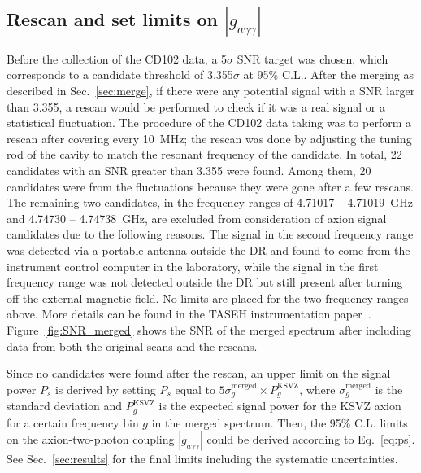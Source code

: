 \documentclass[%
reprint, %
superscriptaddress,
 amsmath,amssymb,
 aps
]{revtex4-2}
\begin{document}
\subsection{Rescan and set limits on $\left|g_{a\gamma\gamma}\right|$} 
Before the collection of the CD102 data, a 5$\sigma$ SNR target was chosen, 
which corresponds to a candidate threshold of 3.355$\sigma$ at 95\% C.L..
 After the merging as described in Sec.~\ref{sec:merge}, if there were 
any potential signal with a SNR larger than 
3.355, a rescan would be performed to check if it was a real signal 
or a statistical fluctuation. 
The procedure of the CD102 data taking was to perform a rescan after 
covering every 10~MHz; the rescan was done by adjusting the tuning rod of the 
cavity to match the resonant frequency of the candidate. 
In total, 22 candidates with an SNR greater than 3.355 were found. 
Among them, 20 candidates were from the fluctuations because they were gone 
after a few rescans. The remaining two candidates, 
in the frequency ranges of 4.71017 -- 4.71019~GHz and 4.74730 -- 4.74738~GHz, 
are excluded from consideration of axion signal candidates due to the 
following reasons. 
The signal in the second frequency range 
was detected via a portable antenna outside the DR and found 
to come from the instrument control computer in the laboratory, while the 
signal in the first frequency range 
was not detected outside the DR but 
still present after turning off the external magnetic field. 
No limits are placed for the two frequency ranges above.  
More details can be found in the 
TASEH instrumentation paper~\cite{TASEHInstrumentation}. 
Figure~\ref{fig:SNR_merged} shows the SNR of the merged spectrum after 
including data from both the original scans and the rescans. 

Since no candidates were found after the rescan, an upper limit on 
the signal power $P_s$ is derived by setting $P_s$ equal to 
$5\sigma_{g}^\text{merged}\times P_{g}^\text{KSVZ}$, where 
$\sigma_{g}^\text{merged}$ is the standard deviation 
and $P_{g}^\text{KSVZ}$ is the expected signal power for the KSVZ axion 
for a certain frequency bin $g$ in the merged spectrum. 
Then, the 95\% C.L. limits on the axion-two-photon coupling 
$\left|g_{a\gamma\gamma}\right|$ could be derived according to 
Eq.~\eqref{eq:ps}. 
See Sec.~\ref{sec:results} for the final limits including the systematic 
uncertainties.
\end{document}
